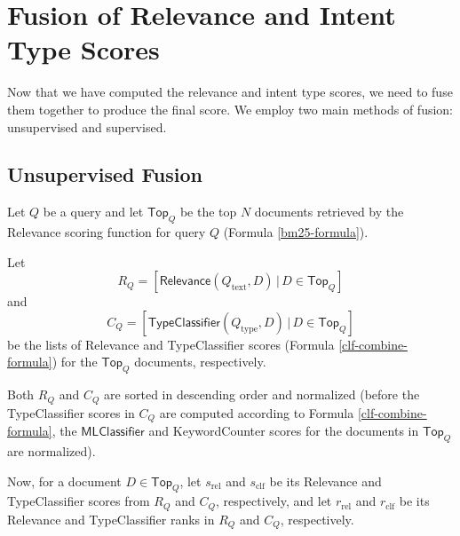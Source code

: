 \section{Fusion of Relevance and Intent Type Scores}\label{fusion-theory}
Now that we have computed the relevance and intent type scores, we need to fuse them together to produce the final score.
We employ two main methods of fusion: unsupervised and supervised.

\subsection{Unsupervised Fusion}\label{unsup-fusion-theory}
Let $Q$ be a query and let $\textsf{Top}_Q$ be the top $N$ documents retrieved by the \textsf{Relevance}
scoring function for query $Q$ (Formula \ref{bm25-formula}).

Let
\[R_Q = [\textsf{Relevance}(Q_{\text{text}}, D) \,|\, D\in \textsf{Top}_Q]\]
and
\[C_Q = [\textsf{TypeClassifier}(Q_{\text{type}}, D) \,|\, D\in \textsf{Top}_Q]\]
be the lists of \textsf{Relevance} and
\textsf{TypeClassifier} scores (Formula \ref{clf-combine-formula})
for the $\textsf{Top}_Q$ documents, respectively.

Both $R_Q$ and $C_Q$ are sorted in descending order and normalized
(before the \textsf{TypeClassifier} scores in $C_Q$ are computed according to Formula \ref{clf-combine-formula}, the
$\textsf{MLClassifier}$ and \textsf{KeywordCounter} scores for the documents in $\textsf{Top}_Q$ are normalized).

Now, for a document $D\in \textsf{Top}_Q$, let $s_{\text{rel}}$ and $s_{\text{clf}}$ be its \textsf{Relevance} and \textsf{TypeClassifier}
scores from $R_Q$ and $C_Q$, respectively,
and let
$r_{\text{rel}}$ and $r_{\text{clf}}$ be its \textsf{Relevance} and \textsf{TypeClassifier} ranks in $R_Q$ and $C_Q$, respectively.

